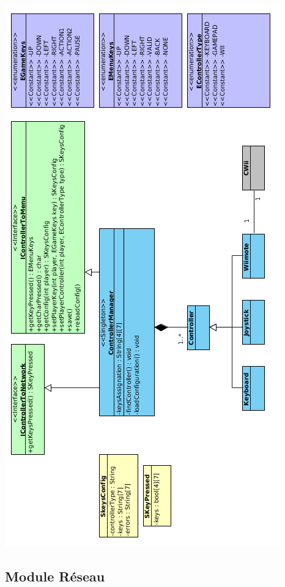 \begin{center}
\includegraphics[scale=0.75]{images/UML/controller.png}
\end{center}

\subsection{Module Réseau}


